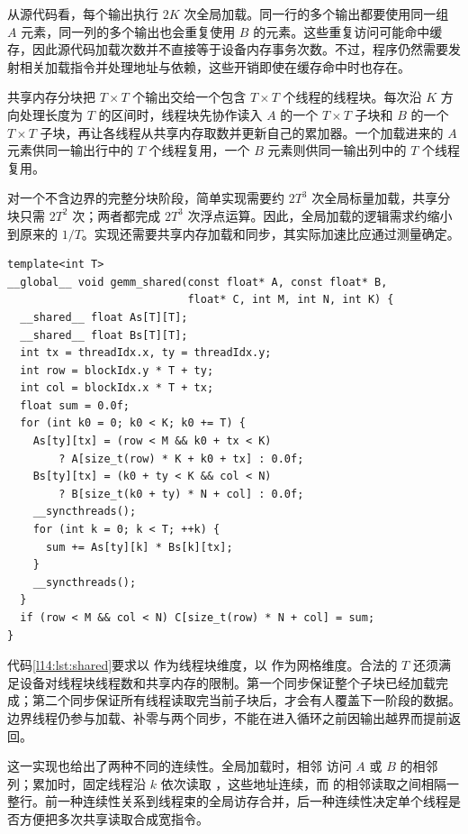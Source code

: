 从源代码看，每个输出执行 $2K$ 次全局加载。同一行的多个输出都要使用同一组 $A$ 元素，同一列的多个输出也会重复使用 $B$ 的元素。这些重复访问可能命中缓存，因此源代码加载次数并不直接等于设备内存事务次数。不过，程序仍然需要发射相关加载指令并处理地址与依赖，这些开销即使在缓存命中时也存在。

共享内存分块把 $T\times T$ 个输出交给一个包含 $T\times T$ 个线程的线程块。每次沿 $K$ 方向处理长度为 $T$ 的区间时，线程块先协作读入 $A$ 的一个 $T\times T$ 子块和 $B$ 的一个 $T\times T$ 子块，再让各线程从共享内存取数并更新自己的累加器。一个加载进来的 $A$ 元素供同一输出行中的 $T$ 个线程复用，一个 $B$ 元素则供同一输出列中的 $T$ 个线程复用。

对一个不含边界的完整分块阶段，简单实现需要约 $2T^3$ 次全局标量加载，共享分块只需 $2T^2$ 次；两者都完成 $2T^3$ 次浮点运算。因此，全局加载的逻辑需求约缩小到原来的 $1/T$。实现还需要共享内存加载和同步，其实际加速比应通过测量确定。

\noindent\begin{minipage}{\linewidth}
\begin{lstlisting}[caption={带边界处理的共享内存分块内核},label={l14:lst:shared}]
template<int T>
__global__ void gemm_shared(const float* A, const float* B,
                            float* C, int M, int N, int K) {
  __shared__ float As[T][T];
  __shared__ float Bs[T][T];
  int tx = threadIdx.x, ty = threadIdx.y;
  int row = blockIdx.y * T + ty;
  int col = blockIdx.x * T + tx;
  float sum = 0.0f;
  for (int k0 = 0; k0 < K; k0 += T) {
    As[ty][tx] = (row < M && k0 + tx < K)
        ? A[size_t(row) * K + k0 + tx] : 0.0f;
    Bs[ty][tx] = (k0 + ty < K && col < N)
        ? B[size_t(k0 + ty) * N + col] : 0.0f;
    __syncthreads();
    for (int k = 0; k < T; ++k) {
      sum += As[ty][k] * Bs[k][tx];
    }
    __syncthreads();
  }
  if (row < M && col < N) C[size_t(row) * N + col] = sum;
}
\end{lstlisting}
\end{minipage}

代码\ref{l14:lst:shared}要求以  作为线程块维度，以  作为网格维度。合法的 $T$ 还须满足设备对线程块线程数和共享内存的限制。第一个同步保证整个子块已经加载完成；第二个同步保证所有线程读取完当前子块后，才会有人覆盖下一阶段的数据。边界线程仍参与加载、补零与两个同步，不能在进入循环之前因输出越界而提前返回。

这一实现也给出了两种不同的连续性。全局加载时，相邻  访问 $A$ 或 $B$ 的相邻列；累加时，固定线程沿 $k$ 依次读取 ，这些地址连续，而  的相邻读取之间相隔一整行。前一种连续性关系到线程束的全局访存合并，后一种连续性决定单个线程是否方便把多次共享读取合成宽指令。

